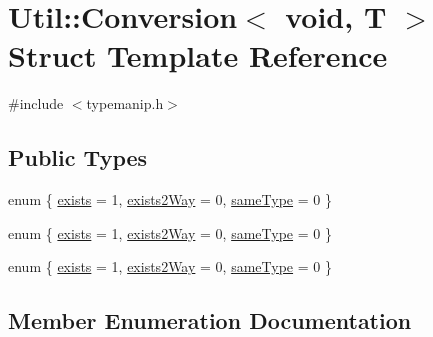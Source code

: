 \hypertarget{structUtil_1_1Conversion_3_01void_00_01T_01_4}{}\section{Util\+:\+:Conversion$<$ void, T $>$ Struct Template Reference}
\label{structUtil_1_1Conversion_3_01void_00_01T_01_4}


{\ttfamily \#include $<$typemanip.\+h$>$}

\subsection*{Public Types}
\begin{DoxyCompactItemize}
\item 
enum \{ \mbox{\hyperlink{structUtil_1_1Conversion_3_01void_00_01T_01_4_a8b1fd02add46bf6581a9beca07dda231a129a8af4937637998530743e1f2d494c}{exists}} = 1, 
\mbox{\hyperlink{structUtil_1_1Conversion_3_01void_00_01T_01_4_a8b1fd02add46bf6581a9beca07dda231a6c0e14be9c85005e75e8983f85b9d839}{exists2\+Way}} = 0, 
\mbox{\hyperlink{structUtil_1_1Conversion_3_01void_00_01T_01_4_a8b1fd02add46bf6581a9beca07dda231aec8732fff4c17d98fbcf61563422dfd5}{same\+Type}} = 0
 \}
\item 
enum \{ \mbox{\hyperlink{structUtil_1_1Conversion_3_01void_00_01T_01_4_a8b1fd02add46bf6581a9beca07dda231a129a8af4937637998530743e1f2d494c}{exists}} = 1, 
\mbox{\hyperlink{structUtil_1_1Conversion_3_01void_00_01T_01_4_a8b1fd02add46bf6581a9beca07dda231a6c0e14be9c85005e75e8983f85b9d839}{exists2\+Way}} = 0, 
\mbox{\hyperlink{structUtil_1_1Conversion_3_01void_00_01T_01_4_a8b1fd02add46bf6581a9beca07dda231aec8732fff4c17d98fbcf61563422dfd5}{same\+Type}} = 0
 \}
\item 
enum \{ \mbox{\hyperlink{structUtil_1_1Conversion_3_01void_00_01T_01_4_a8b1fd02add46bf6581a9beca07dda231a129a8af4937637998530743e1f2d494c}{exists}} = 1, 
\mbox{\hyperlink{structUtil_1_1Conversion_3_01void_00_01T_01_4_a8b1fd02add46bf6581a9beca07dda231a6c0e14be9c85005e75e8983f85b9d839}{exists2\+Way}} = 0, 
\mbox{\hyperlink{structUtil_1_1Conversion_3_01void_00_01T_01_4_a8b1fd02add46bf6581a9beca07dda231aec8732fff4c17d98fbcf61563422dfd5}{same\+Type}} = 0
 \}
\end{DoxyCompactItemize}


\subsection{Member Enumeration Documentation}
\mbox{\label{structUtil_1_1Conversion_3_01void_00_01T_01_4_a7a9a174b4d8737ddf017e4581cf64d6a}} 

